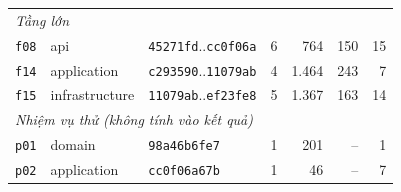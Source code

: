 \begin{tabular}{llllrrr}
\midrule\multicolumn{7}{l}{\textit{Tầng lớn}} \\
\texttt{f08} & api & \texttt{45271fd}..\texttt{cc0f06a} & 6 & 764 & 150 & 15 \\
\texttt{f14} & application & \texttt{c293590}..\texttt{11079ab} & 4 & 1.464 & 243 & 7 \\
\texttt{f15} & infrastructure & \texttt{11079ab}..\texttt{ef23fe8} & 5 & 1.367 & 163 & 14 \\
\midrule\multicolumn{7}{l}{\textit{Nhiệm vụ thử (không tính vào kết quả)}} \\
\texttt{p01} & domain & \texttt{98a46b6fe7} & 1 & 201 & -- & 1 \\
\texttt{p02} & application & \texttt{cc0f06a67b} & 1 & 46 & -- & 7 \\
\bottomrule
\end{tabular}
